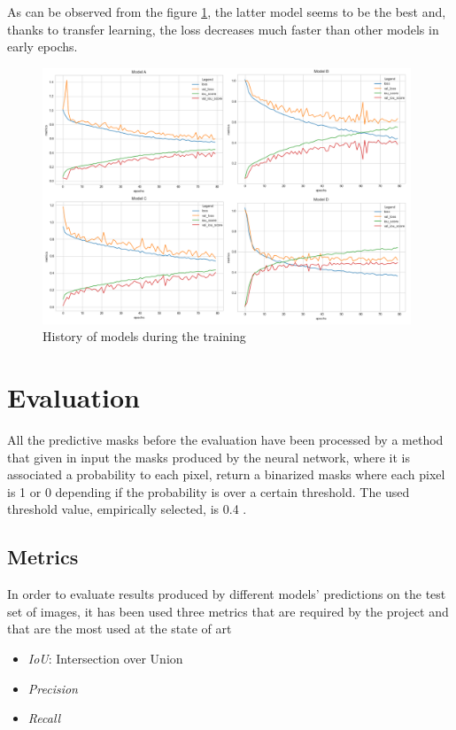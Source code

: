 \documentclass[a4paper,10pt]{report}
\begin{document}
As can be observed from the figure \ref{fig:plot}, the latter model seems to be the best and, thanks to transfer learning, the loss decreases much faster than other models in early epochs.

\begin{figure}[h]
    \centering
    \includegraphics[width=0.98\textwidth]{assets/img/plots.png}
    \caption{History of models during the training}
    \label{fig:plot}
\end{figure}




\chapter{Evaluation}\label{chap:chapter-5}

All the predictive masks before the evaluation have been processed by a method that given in input the masks produced by the neural network, where it is associated a probability to each pixel, return a binarized masks where each pixel is 1 or 0 depending if the probability is over a certain threshold. The used threshold value, empirically selected, is 0.4 .

\section{Metrics}\label{sec:section-51}
In order to evaluate results produced by different models' predictions on the test set of images, it has been used three metrics that are required by the project and that are the most used at the state of art \cite{metrics}
\begin{itemize}
    \item \emph{IoU}: Intersection over Union
    \item \emph{Precision}
    \item \emph{Recall}
\end{itemize}
\end{document}
